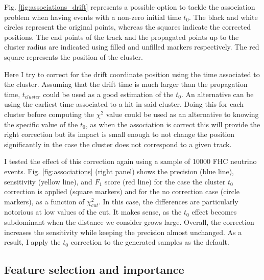 Fig. \ref{fig:associations_drift} represents a possible option to tackle the association problem when having events with a non-zero initial time $t_{0}$. The black and white circles represent the original points, whereas the squares indicate the corrected positions. The end points of the track and the propagated points up to the cluster radius are indicated using filled and unfilled markers respectively. The red square represents the position of the cluster.

Here I try to correct for the drift coordinate position using the time associated to the cluster. Assuming that the drift time is much larger than the propagation time, $t_{cluster}$ could be used as a good estimation of the $t_{0}$. An alternative can be using the earliest time associated to a hit in said cluster. Doing this for each cluster before computing the $\chi^{2}$ value could be used as an alternative to knowing the specific value of the $t_{0}$, as when the association is correct this will provide the right correction but its impact is small enough to not change the position significantly in the case the cluster does not correspond to a given track.

I tested the effect of this correction again using a sample of 10000 FHC neutrino events. Fig. \ref{fig:associations} (right panel) shows the precision (blue line), sensitivity (yellow line), and $F_{1}$ score (red line) for the case the cluster $t_{0}$ correction is applied (square markers) and for the no correction case (circle markers), as a function of $\chi^{2}_{cut}$. In this case, the differences are particularly notorious at low values of the cut. It makes sense, as the $t_{0}$ effect becomes subdominant when the distance we consider grows large. Overall, the correction increases the sensitivity while keeping the precision almost unchanged. As a result, I apply the $t_{0}$ correction to the generated samples as the default.

\subsection{Feature selection and importance}

